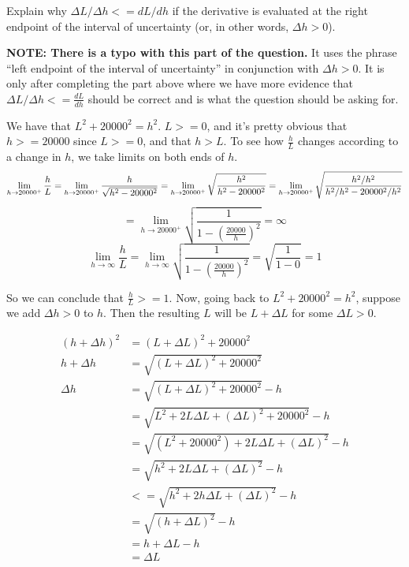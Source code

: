 \documentclass[9pt]{article}
\begin{document}
\begin{tcolorbox}
  Explain why $\Delta L / \Delta h <= dL / dh$ if the derivative is evaluated at the right endpoint of the interval of uncertainty (or, in other words, $\Delta h > 0$).
\end{tcolorbox}

\textbf{NOTE: There is a typo with this part of the question.} It uses the phrase ``left endpoint of the interval of uncertainty'' in conjunction with $\Delta h > 0$. It is only after completing the part above where we have more evidence that $\Delta L / \Delta h <= \frac{dL}{dh}$ should be correct and is what the question should be asking for.

\bigskip

We have that $L^2 + 20000^2 = h^2$. $L >= 0$, and it's pretty obvious that $h >= 20000$ since $L >= 0$, and that $h > L$. To see how $\frac{h}{L}$ changes according to a change in $h$, we take limits on both ends of $h$.
\begin{equation*}
  \lim_{h\to20000^+} \frac{h}{L} = \lim_{h\to20000^+} \frac{h}{\sqrt{h^2 - 20000^2}}
                                 = \lim_{h\to20000^+} \sqrt{\frac{h^2}{h^2 - 20000^2}}
                                 = \lim_{h\to20000^+} \sqrt{\frac{h^2 / h^2}{h^2 / h^2 - 20000^2 / h^2}} \\
\end{equation*}
\begin{equation*}
  = \lim_{h\to20000^+} \sqrt{\frac{1}{1 - (\frac{20000}{h})^2}} = \infty
\end{equation*}
\begin{equation*}
  \lim_{h\to\infty} \frac{h}{L} = \lim_{h\to\infty} \sqrt{\frac{1}{1 - (\frac{20000}{h})^2}} = \sqrt{\frac{1}{1 - 0}} = 1
\end{equation*}

So we can conclude that $\frac{h}{L} >= 1$. Now, going back to $L^2 + 20000^2 = h^2$, suppose we add $\Delta h > 0$ to $h$. Then the resulting $L$ will be $L + \Delta L$ for some $\Delta L > 0$.

\begin{align*}
  (h + \Delta h)^2 &= (L + \Delta L)^2 + 20000^2 \\
  h + \Delta h &= \sqrt{(L + \Delta L)^2 + 20000^2} \\
  \Delta h &= \sqrt{(L + \Delta L)^2 + 20000^2} - h \\
           &= \sqrt{L^2 + 2L\Delta L + (\Delta L)^2 + 20000^2} - h \\
           &= \sqrt{(L^2 + 20000^2) + 2L\Delta L + (\Delta L)^2} - h \\
           &= \sqrt{h^2 + 2L\Delta L + (\Delta L)^2} - h \\
           &<= \sqrt{h^2 + 2h\Delta L + (\Delta L)^2} - h \tag*{(since $h >= L$ and $\Delta L > 0$)} \\
           &= \sqrt{(h + \Delta L)^2} - h \\
           &= h + \Delta L - h \\
           &= \Delta L
\end{align*}
\end{document}
